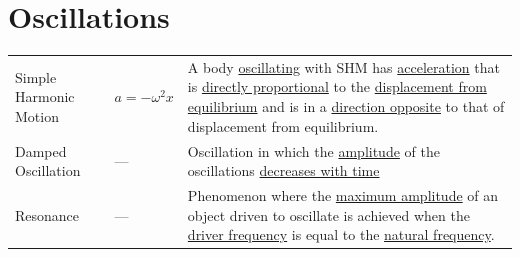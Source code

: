 \documentclass[a4paper,11pt]{article}
\begin{document}
	\section{Oscillations}
		\begin{center}
			\renewcommand{\arraystretch}{1.2}
			\begin{tabular}{@{} l l p{8cm} @{}}
				\toprule
				Simple Harmonic Motion & $a=-\omega^2x$ & A body \underline{oscillating} with SHM has \underline{acceleration} that is \underline{directly proportional} to the \underline{displacement from equilibrium} and is in a \underline{direction opposite} to that of displacement from equilibrium. \\
				Damped Oscillation & ---  & Oscillation in which the  \underline{amplitude} of the oscillations \underline{decreases with time} \\
				Resonance & --- & Phenomenon where the \underline{maximum amplitude} of an object driven to oscillate is achieved when the \underline{driver frequency} is equal to the \underline{natural frequency}. \\
				\bottomrule
			\end{tabular}
		\end{center}
\end{document}
